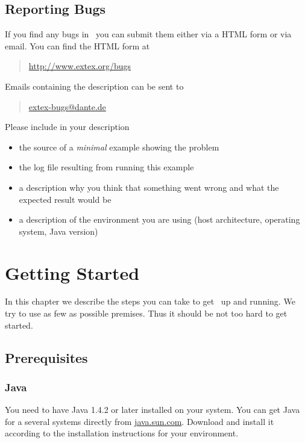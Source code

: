 \documentclass{extex-doc}
\begin{document}
\section{Reporting Bugs}


If you find any bugs in \ExTeX\ you can submit them either via a HTML
form or via email. You can find the HTML form at
\begin{quotation}
  \url{http://www.extex.org/bugs}
\end{quotation}
Emails containing the description can be sent to
\begin{quotation}
  \href{mailto:extex-bugs@dante.de}{extex-bugs@dante.de}
\end{quotation}

Please include in your description 
\begin{itemize}
\item the source of a \emph{minimal} example showing the problem
\item the log file resulting from running this example
\item a description why you think that something went wrong and what
  the expected result would be
\item a description of the environment you are using (host
  architecture, operating system, Java version)
\end{itemize}


\chapter{Getting Started}

In this chapter we describe the steps you can take to get \ExTeX\ up
and running. We try to use as few as possible premises. Thus it should
be not too hard to get started.

\section{Prerequisites}

\subsection{Java}

You need to have Java 1.4.2 or later installed on your
system. You can get Java for a several systems directly from
\url{java.sun.com}. Download and install it according to the
installation instructions for your environment.
\end{document}
